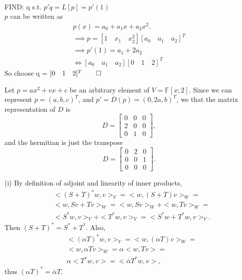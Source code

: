 \documentclass[letterpaper,12pt]{article}
\theoremstyle{definition}
\newenvironment{problem}[2][Problem]{\begin{trivlist}
\item[\hskip \labelsep {\bfseries #1}\hskip \labelsep {\bfseries #2.}]}{\end{trivlist}}
\begin{document}
\begin{problem}{37}~\\
FIND: q s.t.
$p'q= L[p] = p'(1)$ \\
$p$ can be written as
\begin{align*}
p(x) = a_0 +a_1x + a_2x^2. \\
\implies p = [1 \quad x_1 \quad x_2^2][a_0 \quad a_1 \quad a_2]^T \\
\implies p'(1) = a_1 + 2a_2 \\
\iff [a_0 \quad a_1 \quad a_2][0 \quad 1 \quad 2]^T
\end{align*}
So choose q = $[0 \quad 1 \quad 2]^T \qed$

\end{problem}
\begin{problem}{38}
Let $p=ax^2+vx+c$ be an arbitrary element of $V=\mathbb F[x;2]$.
Since we can represent $p=(a, b, c)^T$, and $p'=D(p)=(0,2a,b)^T$,
we that the matrix representation of $D$ is
\begin{equation*}
    D = \begin{bmatrix}
        0 & 0 & 0\\
        2 & 0 & 0\\
        0 & 1 & 0
    \end{bmatrix},
\end{equation*}
and the hermitian is just the transpose
\begin{equation*}
    D = \begin{bmatrix}
        0 & 2 & 0\\
        0 & 0 & 1\\
        0 & 0 & 0
    \end{bmatrix}.
\end{equation*}

\end{problem} \begin{problem}{39}
(i)
By definition of adjoint and linearity of inner products,
\begin{align*}
    &<(S+T)^*w,v>_V=
    <w,(S+T)v>_W=\\
    &<w,Sv+Tv>_W=
    <w,Sv>_W+<w,Tv>_W=\\
    &<S^*w,v>_V + <T^*w,v>_V=
    <S^*w+T^*w,v>_V.
\end{align*}
Then $(S+T)^*=S^*+T^*$.
Also,
\begin{align*}
    &<(\alpha T)^*w,v>_V=
    <w,(\alpha T)v>_W=\\
    &<w,\alpha Tv>_W=
    \alpha<w, Tv>=\\
    &\alpha<T^*w,v>=
    <\bar{\alpha}T^*w,v>,
\end{align*}
thus $(\alpha T)^*=\bar{\alpha}T$.


\end{problem}
\end{document}

